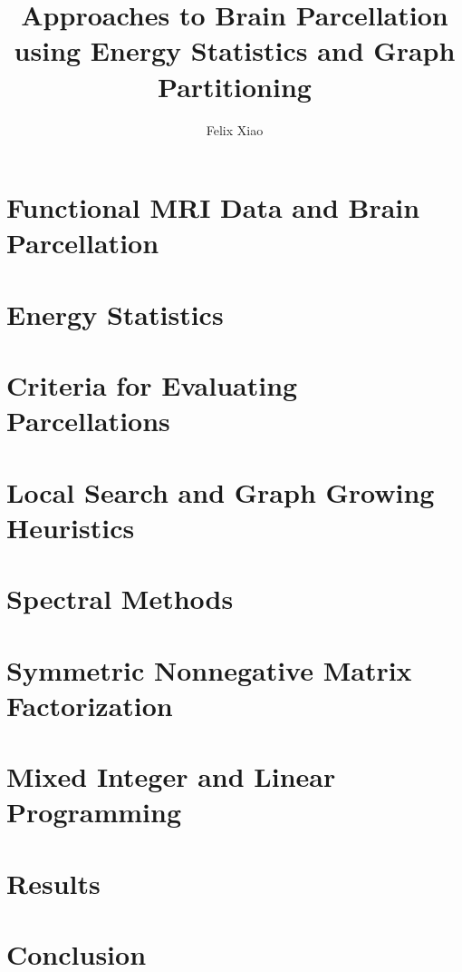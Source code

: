 \documentclass[12pt,lot,lof]{puthesis_undergraduate}
\title{Approaches to Brain Parcellation using Energy Statistics and Graph Partitioning}
\author{Felix Xiao}
\begin{document}
\chapter{Functional MRI Data and Brain Parcellation}
%

\chapter{Energy Statistics}


\chapter{Criteria for Evaluating Parcellations}


\chapter{Local Search and Graph Growing Heuristics}


\chapter{Spectral Methods}


\chapter{Symmetric Nonnegative Matrix Factorization}


\chapter{Mixed Integer and Linear Programming}


\chapter{Results}

\chapter{Conclusion}



\end{document}
